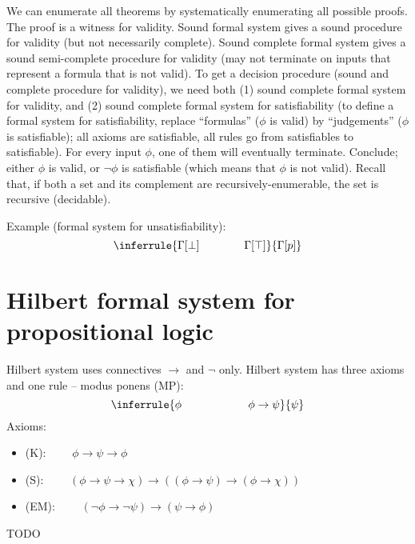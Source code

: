 {{We can enumerate all theorems by systematically enumerating all possible proofs.
The proof is a witness for validity.
Sound formal system gives a sound procedure for validity (but not necessarily complete).
Sound complete formal system gives a sound semi-complete procedure for validity (may not terminate on inputs
that represent a formula that is not valid).
To get a decision procedure (sound and complete procedure for validity), we need both
(1) sound complete formal system for validity, and
(2) sound complete formal system for satisfiability (to define a formal system for satisfiability,
replace ``formulas'' ($\phi$ is valid) by ``judgements'' ($\phi$ is satisfiable);
all axioms are satisfiable, all rules go from satisfiables to satisfiable).
For every input $\phi$, one of them will eventually terminate.
Conclude; either $\phi$ is valid, or $\neg\phi$ is satisfiable (which means that $\phi$ is not valid).
Recall that, if both a set and its complement are recursively-enumerable, the set is recursive (decidable).

Example (formal system for unsatisfiability):
$$\inferrule
{\Gamma[\bot]\qquad\qquad\Gamma[\top]}
{\Gamma[p]}
$$

\section{Hilbert formal system for propositional logic}

Hilbert system uses connectives $\rightarrow$ and $\neg$ only.
Hilbert system has three axioms and one rule -- modus ponens (MP):
$$\inferrule
{\phi\qquad\qquad\qquad\phi\rightarrow\psi}
{\psi}
$$
Axioms:
\begin{itemize}
\item (K): $\qquad
\phi\rightarrow\psi\rightarrow\phi$
\item (S): $\qquad
(\phi\rightarrow\psi\rightarrow\chi)\rightarrow((\phi\rightarrow\psi)\rightarrow(\phi\rightarrow\chi))$
\item (EM): $\qquad
(\neg\phi\rightarrow\neg\psi)\rightarrow(\psi\rightarrow\phi)$
\end{itemize}
TODO

}} %
